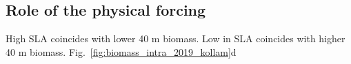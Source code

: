 \documentclass[authoryear,review,11pt]{elsarticle}
\newcommand{\chla}{chl-{\emph{a}}}
\begin{document}



\subsection{Role of the physical forcing}
\label{sec:discuss.forcing}


High SLA coincides with lower 40 m biomass. Low in SLA coincides with higher 40 m biomass. Fig.~\ref{fig:biomass_intra_2019_kollam}d
\end{document}
